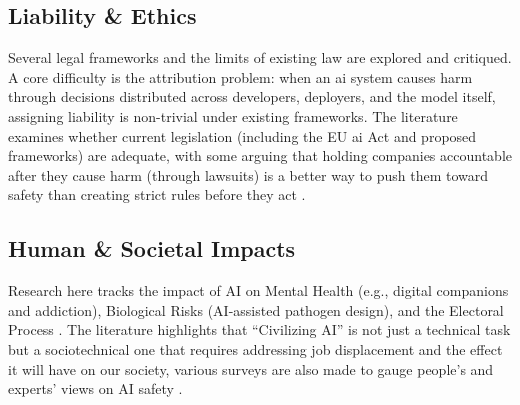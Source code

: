 		\subsection*{Liability \& Ethics}

			Several legal frameworks and the limits of existing law are explored and critiqued. A core difficulty is the attribution problem: when an \gls{ai} system causes harm through decisions distributed across developers, deployers, and the model itself, assigning liability is non-trivial under existing frameworks. The literature examines whether current legislation (including the EU \gls{ai} Act and proposed frameworks) are adequate, with some arguing that holding companies accountable after they cause harm (through lawsuits) is a better way to push them toward safety than creating strict rules before they act \cite{slr_search_67, LocalAIGov2024}.




		\subsection*{Human \& Societal Impacts}

			Research here tracks the impact of AI on Mental Health (e.g., digital companions and addiction), Biological Risks (AI-assisted pathogen design), and the Electoral Process \cite{janczuk_risks_2024}. The literature highlights that ``Civilizing AI'' is not just a technical task but a sociotechnical one that requires addressing job displacement and the effect it will have on our society, various surveys are also made to gauge people's and experts' views on AI safety \cite{field_why_2025, hatz_local_2025}.

